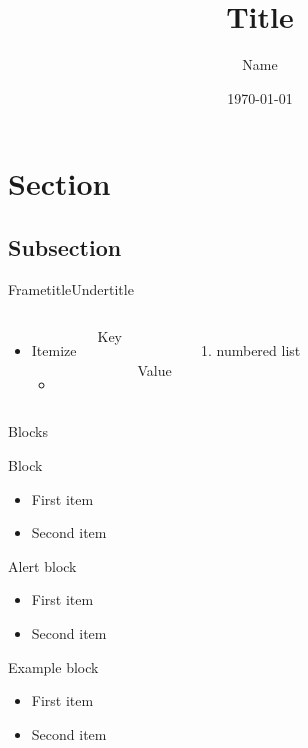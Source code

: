 \documentclass[aspectratio=169]{beamer} %
\title{Title}
\author{Name}
\date{\today}
\begin{document}
\begin{frame}
    \titlepage
\end{frame}

\section{Section}

\subsection{Subsection}

\begin{frame}{Frametitle}{Undertitle}

\begin{columns}
        \begin{itemize}
            \item \alert{Itemize}
            \begin{itemize}
                \item {}
            \end{itemize}
        \end{itemize}
        \begin{description}
            \item[Key] Value
        \end{description}

        \begin{enumerate}
            \item numbered list
        \end{enumerate}
\end{columns}
\end{frame}

\begin{frame}{Blocks}
    \begin{block}{Block}
        \begin{itemize}
            \item<1-> First item
            \item<2-> Second item
        \end{itemize}
    \end{block}

    \begin{alertblock}{Alert block}
        \begin{itemize}
            \item<1-> First item
            \item<2-> Second item
        \end{itemize}
    \end{alertblock}

    \begin{exampleblock}{Example block}
        \begin{itemize}
            \item<1-> First item
            \item<2-> Second item
        \end{itemize}
    \end{exampleblock}
\end{frame}
\end{document}
